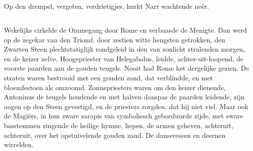 \documentclass[a4paper, 12pt, oneside, dutch]{article}
\begin{document}
Op den drempel, vergeten, verdrietigjes, hurkt Narr wachtende neêr.

\subsection{}
\paragraph{}
Wekelijks cirkelde de Ommegang door Rome en verbaasde de Menigte. Dan werd op de zegekar van den Triomf, door zestien witte hengsten getrokken, den Zwarten Steen plechtstatiglijk rondgeleid in den van zonlicht stralenden morgen, en de keizer zelve, Hoogepriester van Helegabalus, leidde, achter-uit-loopend, de voorste paarden aan de gouden teugels. Nooit had Rome het dergelijke gezien. De straten waren bestrooid met een gouden zand, dat verblindde, en met bloemfestoen als omzoomd. Zonnepriesters waren om den keizer dienende, Antoninus de teugels houdende en met halven danspas de paarden leidende, zijn oogen op den Steen gevestigd, en de priesters zorgden, dat hij niet viel. Maar ook de Magiërs, in hun zware sarapis van symboliesch geborduurde zijde, met zware basstemmen zingende de heilige hymne, liepen, de armen geheven, achteruit, achteruit, over het opstuivelende gouden zand. De danseressen en deernen wirrelden.
\end{document}
